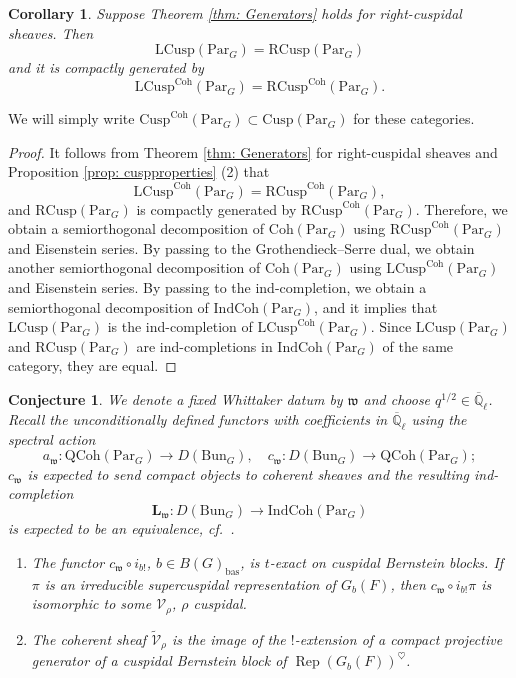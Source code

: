 \documentclass{amsart}
\newtheorem{corollary}[theorem]{Corollary}
\newtheorem{conjecture}[theorem]{Conjecture}
\theoremstyle{definition}
\theoremstyle{remark}
\numberwithin{equation}{section}
\DeclareMathOperator{\Rep}{Rep}
\newcommand{\mc}{\mathcal}
\newcommand{\Q}{\mathbb{Q}}
\newcommand{\mf}{\mathfrak}
\newcommand{\bas}{\mathrm{bas}}
\newcommand{\Bun}{\mathrm{Bun}}
\newcommand{\Par}{\mathrm{Par}}
\newcommand{\IndCoh}{\mathrm{IndCoh}}
\newcommand{\QCoh}{\mathrm{QCoh}}
\newcommand{\Coh}{\mathrm{Coh}}
\newcommand{\Cusp}{\mathrm{Cusp}}
\newcommand{\LCusp}{\mathrm{LCusp}}
\newcommand{\RCusp}{\mathrm{RCusp}}
\begin{document}
\begin{corollary}\label{cor: LCusp=RCusp}
Suppose Theorem \ref{thm: Generators} holds for right-cuspidal sheaves. Then
\[
\LCusp(\Par_G)=\RCusp(\Par_G)
\]
and it is compactly generated by
\[
\LCusp^{\Coh}(\Par_G)=\RCusp^{\Coh}(\Par_G). 
\]
\end{corollary}

We will simply write $\Cusp^{\Coh}(\Par_G)\subset \Cusp(\Par_G)$ for these categories. 

\begin{proof}


It follows from Theorem \ref{thm: Generators} for right-cuspidal sheaves and Proposition \ref{prop: cuspproperties} (2) that
\[
\LCusp^{\Coh}(\Par_G)=\RCusp^{\Coh}(\Par_G),
\]
and $\RCusp(\Par_G)$ is compactly generated by $\RCusp^{\Coh}(\Par_G)$. Therefore, we obtain a semiorthogonal decomposition of $\Coh(\Par_G)$ using $\RCusp^{\Coh}(\Par_G)$ and Eisenstein series. By passing to the Grothendieck--Serre dual, we obtain another semiorthogonal decomposition of $\Coh(\Par_G)$ using $\LCusp^{\Coh}(\Par_G)$ and Eisenstein series. By passing to the ind-completion, we obtain a semiorthogonal decomposition of $\IndCoh(\Par_G)$, and it implies that $\LCusp(\Par_G)$ is the ind-completion of $\LCusp^{\Coh}(\Par_G)$. Since $\LCusp(\Par_G)$ and $\RCusp(\Par_G)$ are ind-completions in $\IndCoh(\Par_G)$ of the same category, they are equal. 
\end{proof}

\begin{conjecture}
We denote a fixed Whittaker datum by $\mf w$ and choose $q^{1/2}\in \overline{\Q}_{\ell}$. 
Recall the unconditionally defined functors with coefficients in $\overline{\Q}_{\ell}$ using the spectral action \cite{fargues--scholze}
\[
a_{\mf w}\colon \QCoh(\Par_G)\to D(\Bun_G), \quad c_{\mf w}\colon D(\Bun_G) \to \QCoh(\Par_G);
\]
$c_{\mf w}$ is expected to send compact objects to coherent sheaves and the resulting ind-completion
\[
\mathbf{L}_{\mf w}\colon D(\Bun_G) \rightarrow \IndCoh(\Par_G) 
\]
is expected to be an equivalence, cf.~\cite{HansenMann}. 

\begin{enumerate}
    \item The functor $c_{\mf w}\circ i_{b!}$, $b\in B(G)_\bas$, is $t$-exact on cuspidal Bernstein blocks. If $\pi$ is an irreducible supercuspidal representation of $G_b (F)$, then $c_{\mf w}\circ i_{b!}\pi$ is isomorphic to some $\mc V_{\rho}$, $\rho$ cuspidal. 
    \item The coherent sheaf $\widetilde{\mc V}_{\rho}$ is the image of the $!$-extension of a compact projective generator of a cuspidal Bernstein block of $\Rep (G_b(F))^{\heartsuit}$. 
\end{enumerate}
\end{conjecture}
\end{document}
